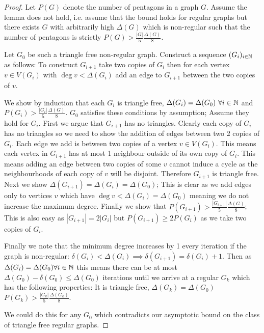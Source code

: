 \begin{proof}
    Let $P(G)$ denote the number of pentagons in a graph $G$.
    Assume the lemma does not hold, i.e. assume that the bound holds for regular graphs but there
    exists $G$ with arbitrarily high $\Delta(G)$ which is non-regular such that the number
    of pentagons is strictly $P(G) > \frac{|G|}{5}\frac{\Delta(G)}{8}$.

    Let $G_0$ be such a triangle free non-regular graph. Construct a sequence $(G_i)_{i\in\mathbb{N}}$ as
    follows: To construct $G_{i+1}$ take two copies of $G_i$ then for each vertex $v\in V(G_i)$
    with $\deg v < \Delta(G_i)$ add an edge to $G_{i+1}$ between the two copies of $v$.

    We show by induction that each $G_i$ is triangle free, $\Delta(G_i)=\Delta(G_0)\ \forall i\in\N$
    and $P(G_i) > \frac{|G_i|}{5}\frac{\Delta(G)}{8}$. $G_0$ satisfies these conditions
    by assumption; Assume they hold for $G_i$. First we argue that $G_{i+1}$ has no
    triangles. Clearly each copy of $G_i$ has no triangles so we need to show the
    addition of edges between two 2 copies of $G_i$. Each edge we add is between
    two copies of a vertex $v\in V(G_i)$. This means
    each vertex in $G_{i+1}$ has at most 1 neighbour outside of its own copy of $G_i$.
    This means adding an edge between two copies of some $v$ cannot induce a cycle
    as the neighbourhoods of each copy of $v$ will be disjoint. Therefore $G_{i+1}$ is
    triangle free. Next we show $\Delta(G_{i+1})=\Delta(G_i)=\Delta(G_0)$; This is
    clear as we add edges only to vertices $v$ which have $\deg v < \Delta(G_i)=\Delta(G_0)$
    meaning we do not increase the maximum degree.
    Finally we show that $P(G_{i+1}) > \frac{|G_{i+1}|}{5}\frac{\Delta(G)}{8}$;
    This is also easy as $|G_{i+1}|=2|G_i|$ but $P(G_{i+1}) \geq 2 P(G_i)$ as we take
    two copies of $G_i$.

    Finally we note that the minimum degree increases by 1 every iteration if the
    graph is non-regular: $\delta(G_i) < \Delta(G_i) \implies \delta(G_{i+1})=\delta(G_i) + 1$.
    Then as $\Delta(G_i)=\Delta(G_0)\forall i\in\mathbb{N}$ this means there can be at most
    $\Delta(G_0)-\delta(G_0) \leq \Delta(G_0)$ iterations until we arrive at a regular
    $G_k$ which has the following properties: It is triangle free, $\Delta(G_k)=\Delta(G_0)$
    $P(G_k) > \frac{|G_k|}{5}\frac{\Delta(G_k)}{8}$.

    We could do this for any $G_0$ which contradicts our asymptotic bound on the
    class of triangle free regular graphs.
\end{proof}

